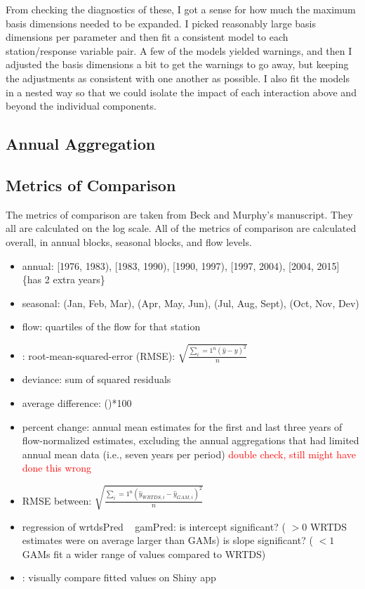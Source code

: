 \documentclass[12pt]{amsart}
\begin{document}
From checking the diagnostics of these, I got a sense for how much the maximum basis dimensions needed to be expanded. I picked reasonably large basis dimensions per parameter and then fit a consistent model to each station/response variable pair. A few of the models yielded warnings, and then I adjusted the basis dimensions a bit to get the warnings to go away, but keeping the adjustments as consistent with one another as possible. I also fit the models in a nested way so that we could isolate the impact of each interaction above and beyond the individual components. 

\subsection{Annual Aggregation}

\subsection{Metrics of Comparison}

The metrics of comparison are taken from Beck and Murphy's manuscript. They all are calculated on the log scale.  All of the metrics of comparison are calculated overall, in annual blocks, seasonal blocks, and flow levels. 

\begin{itemize}
\item annual: [1976, 1983), [1983, 1990), [1990, 1997), [1997, 2004), [2004, 2015] \{has 2 extra years\}
\item seasonal: (Jan, Feb, Mar), (Apr, May, Jun), (Jul, Aug, Sept), (Oct, Nov, Dev)
\item flow: quartiles of the flow for that station
\end{itemize}

\begin{itemize}
\item: root-mean-squared-error (RMSE): $\sqrt{\frac{\sum_{i}=1^n (\hat{y}-y)^2}{n}}$
\item deviance: sum of squared residuals
\item average difference: \left(\right)*100
\item percent change: annual mean estimates for the first and last three years of flow-normalized estimates, excluding the annual aggregations that had limited annual mean data (i.e., seven years per period) \textcolor{red}{double check, still might have done this wrong}
\item RMSE between: $\sqrt{\frac{\sum_{i}=1^n (\hat{y}_{WRTDS,i}-\hat{y}_{GAM,i})^2}{n}}$
\item regression of wrtdsPred ~ gamPred: is intercept significant? ( $>0$ WRTDS estimates were on average larger than GAMs) is slope significant? ( $<1$ GAMs fit a wider range of values compared to WRTDS)
\item: visually compare fitted values on Shiny app
\end{itemize}
\end{document}
